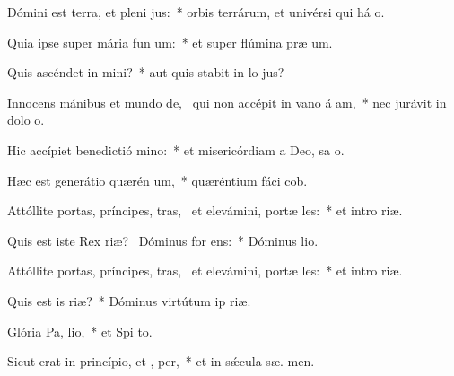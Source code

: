 \item Dómini est terra, et pleni jus:~* orbis terrárum, et univérsi qui há  o.
\item Quia ipse super mária fun um:~* et super flúmina præ um.
\item Quis ascéndet in  mini?~* aut quis stabit in lo  jus?
\item Innocens mánibus et mundo de,~\pscross{} qui non accépit in vano á am,~* nec jurávit in dolo  o.
\item Hic accípiet benedictió  mino:~* et misericórdiam a Deo, sa o.
\item Hæc est generátio quærén um,~* quæréntium fáci  cob.
\item Attóllite portas, príncipes, tras,~\pscross{} et elevámini, portæ les:~* et intro  riæ.
\item Quis est iste Rex riæ?~\pscross{} Dóminus for  ens:~* Dóminus   lio.
\item Attóllite portas, príncipes, tras,~\pscross{} et elevámini, portæ les:~* et intro  riæ.
\item Quis est is  riæ?~* Dóminus virtútum ip   riæ.
\item Glória Pa,  lio,~* et Spi to.
\item Sicut erat in princípio, et ,  per,~* et in sǽcula sæ. men.
